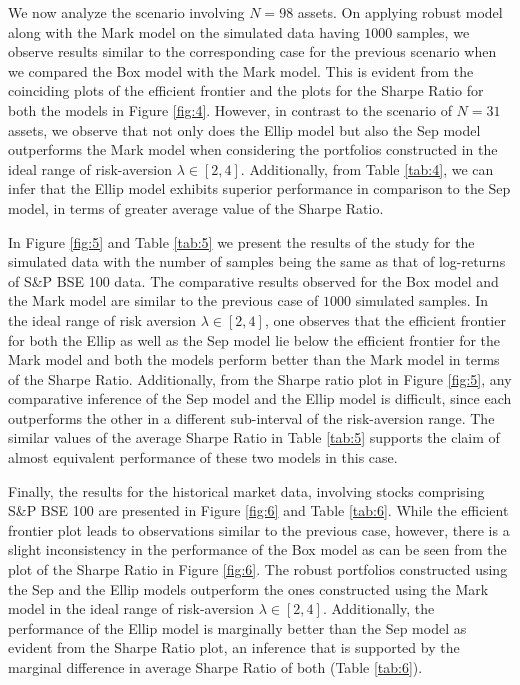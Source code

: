 \documentclass[12pt]{article}
\numberwithin{equation}{section}
\begin{document}
We now analyze the scenario involving $N=98$ assets. On applying robust model along with the Mark model on the simulated data having $1000$ samples, we observe results similar to the corresponding case for the previous scenario when we compared the Box model with the Mark model. This is evident from the coinciding plots of the efficient frontier and the plots for the Sharpe Ratio for both the models in Figure \ref{fig:4}. However, in contrast to the scenario of $N=31$ assets, we observe that not only does the Ellip model but also the Sep model outperforms the Mark model when considering the portfolios constructed in the ideal range of risk-aversion $\lambda\in [2,4]$. Additionally, from Table \ref{tab:4}, we can infer that the Ellip model exhibits superior performance in comparison to the Sep model, in terms of greater average value of the Sharpe Ratio.

In Figure \ref{fig:5} and Table \ref{tab:5} we present the results of the study for the simulated data with the number of samples being the same as that of log-returns of S\&P BSE 100 data. The comparative results observed for the Box model and the Mark model are similar to the previous case of $1000$ simulated samples. In the ideal range of risk aversion $\lambda\in [2,4]$, one observes that the efficient frontier for both the Ellip as well as the Sep model lie below the efficient frontier for the Mark model and both the models perform better than the Mark model in terms of the Sharpe Ratio. Additionally, from the Sharpe ratio plot in Figure \ref{fig:5}, any comparative inference of the Sep model and the Ellip model is difficult, since each outperforms the other in a different sub-interval of the risk-aversion range. The similar values of the average Sharpe Ratio in Table \ref{tab:5} supports the claim of almost equivalent performance of these two models in this case.

Finally, the results for the historical market data, involving stocks comprising S\&P BSE 100 are presented in Figure \ref{fig:6} and Table \ref{tab:6}. While the efficient frontier plot leads to observations similar to the previous case, however, there is a slight inconsistency in the performance of the Box model as can be seen from the plot of the Sharpe Ratio in Figure \ref{fig:6}. The robust portfolios constructed using the Sep and the Ellip models outperform the ones constructed using the Mark model in the ideal range of risk-aversion $\lambda\in [2,4]$. Additionally, the performance of the Ellip model is marginally better than the Sep model as evident from the Sharpe Ratio plot, an inference that is supported by the marginal difference in average Sharpe Ratio of both (Table \ref{tab:6}).
\end{document}
